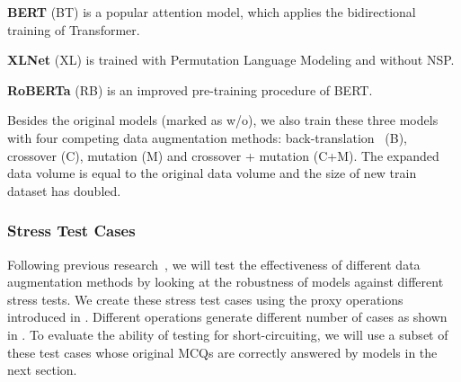\textbf{BERT} (BT) is a popular attention model, which applies the bidirectional training of Transformer. 

\textbf{XLNet} (XL) is trained with Permutation Language Modeling and without NSP.

\textbf{RoBERTa} (RB) is an improved pre-training procedure of BERT.

Besides the original models (marked as w/o), we also train these three
models with four competing data augmentation methods: 
back-translation~\cite{back2019} (B),  crossover (C), mutation (M)
and crossover + mutation (C+M). 
The expanded data volume is equal to the original data volume and 
the size of new train dataset has doubled.

\subsubsection{Stress Test Cases}
Following previous research~\cite{checklist2020acl}, 
we will test the effectiveness of different data augmentation
methods by looking at the robustness of models against
different stress tests.
We create these stress test cases using the proxy operations
introduced in .
Different operations generate different number of cases 
as shown in . To evaluate the
ability of testing for short-circuiting, we will
use a subset of these test cases whose original MCQs are correctly answered by models in the next section.

